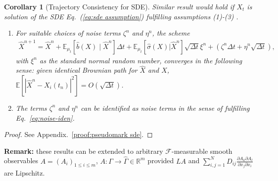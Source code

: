 \documentclass[11pt, a4paper, oneside, reqno]{amsart}
\newtheorem{corollary}[theorem]{Corollary}
\begin{document}
\begin{corollary}[Trajectory Consistency for SDE] \label{corol:pseudo-mark-sde} Similar result would hold if $X_t$ is solution of the SDE Eq.~(\ref{eq:sde assumption}) fulfilling assumptions (1)-(3) .
\begin{enumerate}
\item For suitable choices of noise terms $\zeta^n$ and $\eta^n$, the scheme 
 \begin{eqnarray}
            \hat{X}^{n+1} = \hat{X}^{n} +  \mathbb{E}_{\mu_t}[\hat{b}(X)\mid\hat{X}^n]\Delta t+\mathbb{E}_{\mu_t}[\hat{\sigma}(X)|\hat{X}^n] \sqrt{\Delta t}\xi^n+\left(\zeta^n\Delta t+\eta^n \sqrt{\Delta t}\right), 
        \end{eqnarray}
        with $\xi^n$ as the standard normal random number, converges in the following sense: given identical Brownian path for $\hat{X}$ and $X$, $\mathbb{E}[|\hat{X}^n-X_i(t_n)|^2]=O(\sqrt{\Delta t})$. 
\item The terms $\zeta^n$ and $\eta^n$ can be identified as noise terms in the sense of fulfilling Eq.~\eqref{eq:noise-iden}.
\end{enumerate}        
\end{corollary}
\begin{proof}
    See Appendix.~\ref{proof:pseudomark sde}.
\end{proof}
\noindent \textbf{Remark:} these results can be extended to arbitrary $\mathcal{F}$-measurable smooth observables $A=(A_i)_{1\leq i\leq m}$, $A:\Gamma\to\hat{\Gamma}\in\mathbb{R}^m$ provided $LA$ and $\sum_{i,j=1}^ND_{ij}\frac{\partial A_k \partial A_l}{\partial x_j \partial x_i}$ are Lipschitz.
\end{document}
